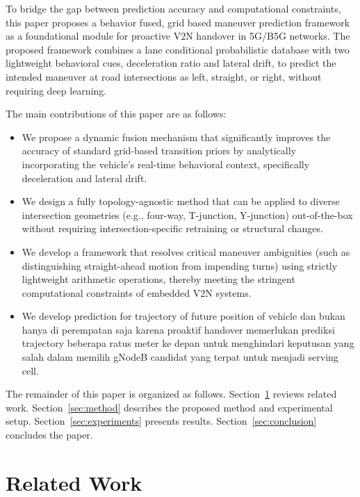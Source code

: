 \documentclass[conference]{IEEEtran}
\begin{document}
To bridge the gap between prediction accuracy and computational constraints, this paper proposes a behavior fused, grid based maneuver prediction framework as a foundational module for proactive V2N handover in 5G/B5G networks. 
The proposed framework combines a lane conditional probabilistic database with two lightweight behavioral cues, deceleration ratio and lateral drift, to predict the intended maneuver at road intersections as left, straight, or right, without requiring deep learning.

The main contributions of this paper are as follows:
\begin{itemize}
  \item We propose a dynamic fusion mechanism that significantly improves the accuracy of standard grid-based transition priors by analytically incorporating the vehicle's real-time behavioral context, specifically deceleration and lateral drift.
  \item We design a fully topology-agnostic method that can be applied to diverse intersection geometries (e.g., four-way, T-junction, Y-junction) out-of-the-box without requiring intersection-specific retraining or structural changes.
  \item We develop a framework that resolves critical maneuver ambiguities (such as distinguishing straight-ahead motion from impending turns) using strictly lightweight arithmetic operations, thereby meeting the stringent computational constraints of embedded V2N systems.
  \item We develop prediction for trajectory of future position of vehicle dan bukan hanya di perempatan saja karena proaktif handover memerlukan prediksi trajectory beberapa ratus meter ke depan untuk menghindari keputusan yang salah dalam memilih gNodeB candidat yang terpat untuk menjadi serving cell.
\end{itemize}

The remainder of this paper is organized as follows.
Section~\ref{sec:related} reviews related work.
Section~\ref{sec:method} describes the proposed method and experimental setup.
Section~\ref{sec:experiments} presents results.
Section~\ref{sec:conclusion} concludes the paper.

\section{Related Work}
\label{sec:related}
\end{document}
